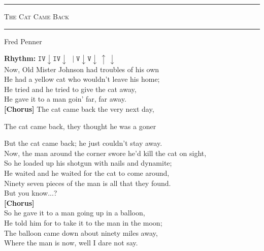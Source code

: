 \documentclass[10pt, twoside, a4paper]{article}
\begin{document}
\begin{center}

	\hrule \vspace{0.2cm}
     	\textsc{\LARGE The Cat Came Back}
	\vspace{0.2cm} \hrule \vspace{0.2cm}
      	{\large Fred Penner}
      	
\end{center}


		
\textbf{Rhythm:} $\texttt{IV} \downarrow \texttt{IV} \downarrow \,\, \mid \texttt{V} \downarrow \texttt{V} \downarrow \, \uparrow \, \downarrow$ \\

Now, Old Mister Johnson had troubles of his own \\
He had a yellow cat who wouldn't leave his home; \\
He tried and he tried to give the cat away, \\
He gave it to a man goin' far, far away. \\

\textbf{[Chorus]}	The cat came back the very next day,

\hspace{43pt}		The cat came back, they thought he was a goner

\hspace{43pt}		But the cat came back; he just couldn't stay away. \\

Now, the man around the corner swore he'd kill the cat on sight, \\
So he loaded up his shotgun with nails and dynamite; \\
He waited and he waited for the cat to come around, \\
Ninety seven pieces of the man is all that they found. \\

But you know...? \\
\textbf{[Chorus]} \\

So he gave it to a man going up in a balloon, \\
He told him for to take it to the man in the moon; \\
The balloon came down about ninety miles away, \\
Where the man is now, well I dare not say. \\
\end{document}
